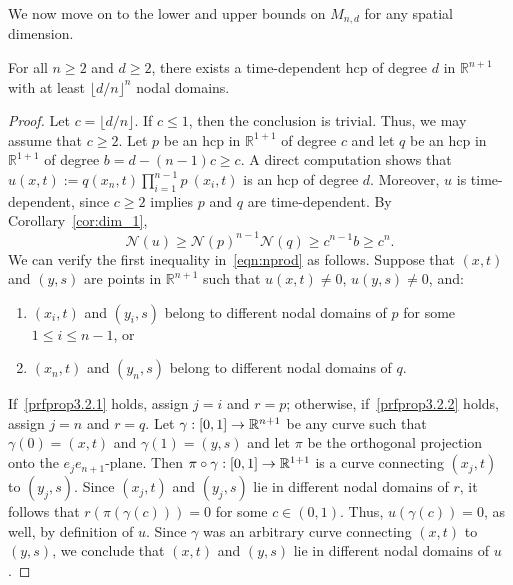 \documentclass[AHL,Unicode,longabstracts,published]{cedram}
\newcommand{\R}{\mathbb{R}}
\newcommand{\nodal}{\mathcal{N}}
\newcommand*{\relabel}{
\renewcommand{\labelenumi}{(\theenumi)}}
\newcommand*{\alphenumi}{
\renewcommand*{\theenumi}{\alph{enumi}}\relabel}
\renewcommand*{\to}{\mathchoice{\longrightarrow}{\rightarrow}{\rightarrow}{\rightarrow}}
\newcommand{\R}{\mathbb{R}}
\begin{document}
We now move on to the lower and upper bounds on $M_{n,d}$ for any spatial dimension.

\begin{prop}\label{prop:courant_hcp}
For all $n\geq 2$ and $d\geq 2$, there exists a time-dependent hcp of degree $d$ in $\R^{n+1}$ with at least $\lfloor d/n\rfloor^n$ nodal domains.
\end{prop}
\begin{proof}
Let $c = \lfloor d/n \rfloor$. If $c\leq 1$, then the conclusion is trivial. Thus, we may assume that $c\geq 2$. Let $p$ be an hcp in $\R^{1+1}$ of degree $c$ and let $q$ be an hcp in $\R^{1+1}$ of degree $b=d - (n-1)c \ge c$. A direct computation shows that $u(x,t):= q(x_n,t)\prod_{i=1}^{n-1} p~(x_i, t)$ is an hcp of degree $d$. Moreover, $u$ is time-dependent, since $c\geq 2$ implies $p$ and $q$ are time-dependent. By Corollary~\ref{cor:dim_1},
\begin{equation}\label{eqn:nprod}
\nodal(u) \ge \nodal(p)^{n-1}\nodal(q)\geq c^{n-1}b\geq c^n.
\end{equation}
We can verify the first inequality in~\eqref{eqn:nprod} as follows. Suppose that $(x,t)$ and $(y,s)$ are points in $\R^{n+1}$ such that $u(x,t)\neq 0$, $u(y,s)\neq 0$, and:
\begin{enumerate}\alphenumi
\item\label{prfprop3.2.1}
$(x_i,t)$ and $(y_i,s)$ belong to different nodal domains of $p$ for some $1\leq i\leq n-1$, or
\item\label{prfprop3.2.2}
$(x_n,t)$ and $(y_n,s)$ belong to different nodal domains of $q$.
\end{enumerate}
If~\eqref{prfprop3.2.1} holds, assign $j=i$ and $r=p$; otherwise, if~\eqref{prfprop3.2.2} holds, assign $j=n$ and $r=q$. Let $\gamma:[0,1]\to\R^{n+1}$ be any curve such that $\gamma(0)=(x,t)$ and $\gamma(1)=(y,s)$ and let $\pi$ be the orthogonal projection onto the $e_je_{n+1}$-plane. Then $\pi\circ \gamma:[0,1]\to\R^{1+1}$ is a curve connecting $(x_j,t)$ to $(y_j,s)$. Since $(x_j,t)$ and $(y_j,s)$ lie in different nodal domains of $r$, it follows that $r(\pi(\gamma(c)))=0$ for some $c\in(0,1)$. Thus, $u(\gamma(c))=0$, as well, by definition of $u$. Since $\gamma$ was an arbitrary curve connecting $(x,t)$ to $(y,s)$, we conclude that $(x,t)$ and $(y,s)$ lie in different nodal domains of $u$.


\end{proof}
\end{document}
